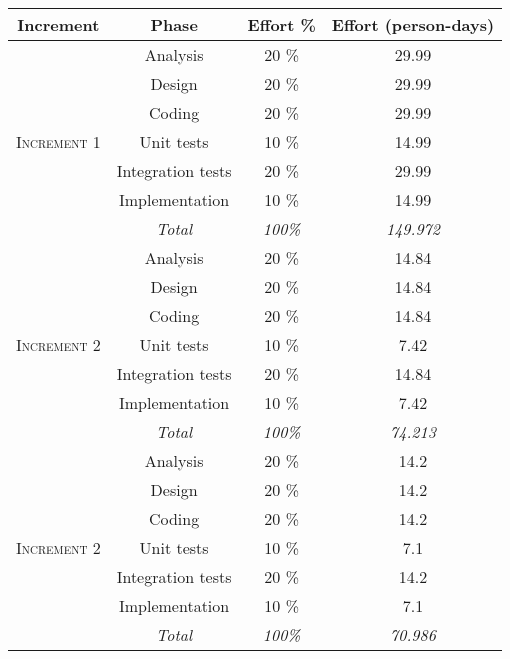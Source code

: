 
\begin{tabular}{|c|c|c|c|}
\hline
\textbf{Increment} & \textbf{Phase} & \textbf{Effort \%} & \textbf{Effort (person-days)} \\ \hline \hline

\multirow{7}{*}{\textsc{Increment 1}} & Analysis & 20 \% & 29.99 \\ \cline{2-4}
& Design & 20 \% & 29.99 \\ \cline{2-4}
& Coding & 20 \% & 29.99 \\ \cline{2-4}
& Unit tests & 10 \% & 14.99 \\ \cline{2-4}
& Integration tests & 20 \% & 29.99 \\ \cline{2-4}
& Implementation & 10 \% & 14.99 \\ \cline{2-4}
& \textit{Total} & \textit{100\%} & \textit{149.972} \\ \hline \hline

\multirow{7}{*}{\textsc{Increment 2}} & Analysis & 20 \% & 14.84 \\ \cline{2-4}
& Design & 20 \% & 14.84 \\ \cline{2-4}
& Coding & 20 \% & 14.84 \\ \cline{2-4}
& Unit tests & 10 \% & 7.42 \\ \cline{2-4}
& Integration tests & 20 \% & 14.84 \\ \cline{2-4}
& Implementation & 10 \% & 7.42 \\ \cline{2-4}
& \textit{Total} & \textit{100\%} & \textit{74.213} \\ \hline \hline

\multirow{7}{*}{\textsc{Increment 2}} & Analysis & 20 \% & 14.2 \\ \cline{2-4}
& Design & 20 \% & 14.2 \\ \cline{2-4}
& Coding & 20 \% & 14.2 \\ \cline{2-4}
& Unit tests & 10 \% & 7.1 \\ \cline{2-4}
& Integration tests & 20 \% & 14.2 \\ \cline{2-4}
& Implementation & 10 \% & 7.1 \\ \cline{2-4}
& \textit{Total} & \textit{100\%} & \textit{70.986} \\ \hline

\end{tabular}
